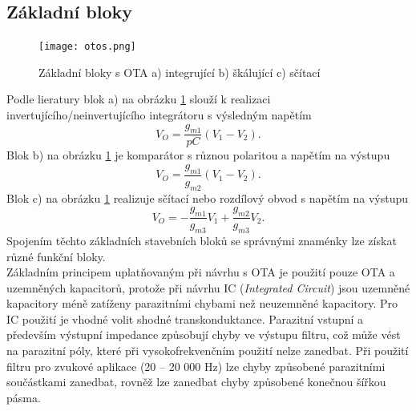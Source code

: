 \subsection{Základní bloky}
\begin{figure}[h]
\centering
\texttt{[image: otos.png]}
\caption[Základní bloky s OTA]{Základní bloky s OTA a) integrující b) škálující c) sčítací \label{s:BLO}}
\end{figure}
\noindent Podle lieratury \cite{18} blok a) na obrázku \ref{s:BLO} slouží k realizaci invertujícího/neinvertujícího integrátoru s výsledným napětím
\begin{equation}
V_O = \frac{g_{m1}}{pC}(V_1 - V_2).
\end{equation}
Blok b) na obrázku \ref{s:BLO} je komparátor s různou polaritou a napětím na výstupu
\begin{equation}
V_O = \frac{g_{m1}}{g_{m2}}(V_1 - V_2).
\end{equation}
Blok c) na obrázku \ref{s:BLO} realizuje sčítací nebo rozdílový obvod s napětím na výstupu
\begin{equation}
V_O = -\frac{g_{m1}}{g_{m3}}V_1 + \frac{g_{m2}}{g_{m3}}V_2.\label{s:BLO3}
\end{equation}
\noindent Spojením těchto základních stavebních bloků se správnými znaménky lze získat různé funkční bloky.\\
Základním principem uplatňovaným při návrhu s OTA je použití pouze OTA a uzemněných kapacitorů, protože při návrhu IC (\textit{Integrated Circuit}) jsou uzemněné kapacitory méně zatíženy parazitními chybami než neuzemněné kapacitory. Pro IC použití je vhodné volit shodné transkonduktance. Parazitní vstupní a především výstupní impedance způsobují chyby ve výstupu filtru, což může vést na parazitní póly, které při vysokofrekvenčním použití nelze zanedbat. Při použití filtru pro zvukové aplikace (20 -- 20 000 Hz) lze chyby způsobené parazitními součástkami zanedbat, rovněž lze zanedbat chyby způsobené konečnou šířkou pásma.
